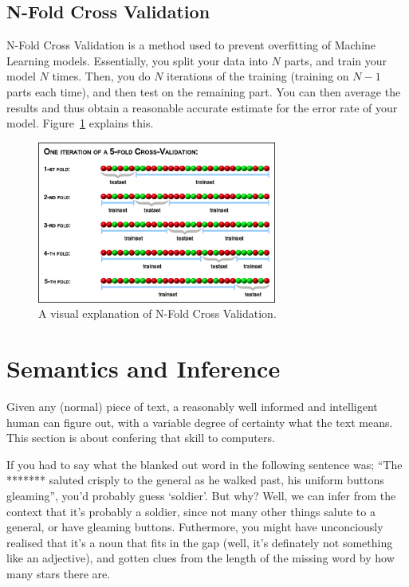 \subsection{N-Fold Cross Validation}

N-Fold Cross Validation is a method used to prevent overfitting of Machine
Learning models. Essentially, you split your data into $N$ parts, and train your
model $N$ times. Then, you do $N$ iterations of the training (training on $N-1$
parts each time), and then test on the remaining part. You can then average the
results and thus obtain a reasonable accurate estimate for the error rate of
your model. Figure~\ref{fig:cross-validation} explains this.

\begin{figure}[h]
  \centering
  \includegraphics[width=0.7\textwidth]{images/cross-validation}
  \caption{A visual explanation of N-Fold Cross Validation.}
  \label{fig:cross-validation}
\end{figure}

\section{Semantics and Inference}

Given any (normal) piece of text, a reasonably well informed and intelligent
human can figure out, with a variable degree of certainty what the text means.
This section is about confering that skill to computers.

If you had to say what the blanked out word in the following sentence was; ``The
******* saluted crisply to the general as he walked past, his uniform buttons
gleaming'', you'd probably guess `soldier'. But why? Well, we can infer from the
context that it's probably a soldier, since not many other things salute to a
general, or have gleaming buttons. Futhermore, you might have unconciously
realised that it's a noun that fits in the gap (well, it's definately not
something like an adjective), and gotten clues from the length of the missing
word by how many stars there are.

